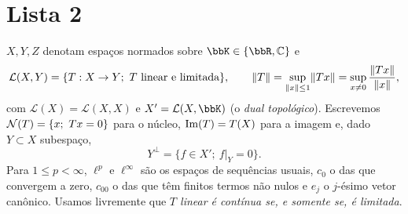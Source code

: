 \section{Lista 2}
\renewcommand{\currentlista}{2}
\setcounter{exq}{0}

\renewcommand{\eps}{\varepsilon}

\begin{tcolorbox}[
  enhanced,
  breakable,
  colback=mytheorembg,
  colframe=doc!80!black,
  boxrule=0sp,
  borderline west={2.5pt}{0pt}{doc!80!black},
  sharp corners,
  title=\textbf{Notação e Convenções},
  coltitle=doc!80!black,
  fonttitle=\bfseries\sffamily,
  detach title,
  before upper=\tcbtitle\par\smallskip
]
$X,Y,Z$ denotam espaços normados sobre $\K\in\{\R,\mathbb{C}\}$ e
\[ \mathcal{L}(X,Y)=\{T:X\to Y;\ T \text{ linear e limitada}\},\qquad \lVert T\rVert=\sup_{\lVert x\rVert\le1}\lVert Tx\rVert=\sup_{x\neq0}\frac{\lVert Tx\rVert}{\lVert x\rVert}, \]
com $\mathcal{L}(X)=\mathcal{L}(X,X)$ e $X'=\mathcal{L}(X,\K)$ (o \emph{dual topológico}). Escrevemos $\Ker(T)=\{x;\ Tx=0\}$ para o núcleo, $\operatorname{Im}(T)=T(X)$ para a imagem e, dado $Y\subset X$ subespaço,
\[ Y^{\perp}=\{f\in X';\ f|_Y=0\}. \]
Para $1\le p<\infty$, $\ell^p$ e $\ell^\infty$ são os espaços de sequências usuais, $c_0$ o das que convergem a zero, $c_{00}$ o das que têm finitos termos não nulos e $e_j$ o $j$-ésimo vetor canônico. Usamos livremente que \emph{$T$ linear é contínua se, e somente se, é limitada}.
\end{tcolorbox}

